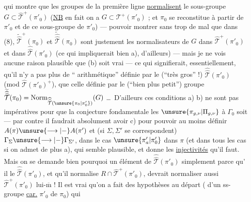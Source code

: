 qui montre que les groupes de la première ligne
\uline{normalisent} le sous-groupe $G\subset\widehat{\mathcal T}^{+}(\pi'_0)$
(\uline{NB} en fait on a $G\subset\mathcal T^{+}(\pi'_0)$ ;  et $\pi_0$
se reconstitue à partir de $\pi'_0$ et de
ce sous-groupe de $\pi'_0$) --- 
pouvoir montrer sans trop de mal
que  dans (8), $\widetilde{\widehat{\mathcal T}}^{+}(\pi_0)$ et $\widetilde{\widehat{\widehat{\mathcal T}}}(\pi_0)$
sont justement les normalisateurs de $G$
dans $\widehat{\mathcal T}^{+}(\pi'_0)$ et dans $\widehat{\widehat{\mathcal T}}(\pi'_0)$ (ce
qui impliquerait bien a), d'ailleurs) ---
mais je ne vois aucune raison plausible
que (b) soit vrai --- ce qui signifierait,
essentiellement, qu'il n'y a pas plus de
`` arithmétique'' définie par le
(``très gros'' !) $\widehat{\widehat{\mathcal T}}(\pi'_0)$ (mod $\widehat{\mathcal T}(\pi'_0)^{+}$), que
celle définie par le (``bien plus petit'') groupe
$\widetilde{\widehat{\widehat{\mathcal T}}}(\pi_0)=\operatorname{Norm}_{\widehat{\widehat{\mathcal T}}(\unsure{\pi_0|\pi'_0})}(G)$ \dots\ D'ailleurs ces
conditions a) b) ne sont pas impératives
pour que la conjecture fondamentale
 les $\unsure{\pi_{g,\nu}|\Pi_{g,\nu}}$ à $\Gamma_0$ soit  ---
par contre il faudrait absolument avoir
c) pour pouvoir au moins définir
$A(\pi)\unsure{\longrightarrow|{-}}A(\pi')$ et (si $\Sigma,\Sigma'$ se correspondent)
$\Gamma_{\Sigma}\unsure{\longrightarrow|{-}}\Gamma_{\Sigma'}$, dans le cas $\unsure{\pi'_a|\pi'_0}$  dans $\pi$
(et dans tous les cas si on admet de plus
a), qui semble  plausible, et donne
les \uline{injectivités} qu'il faut. Mais on
se demande bien pourquoi un élément
de  $\widehat{\widehat{\mathcal T}}(\pi'_0)$ simplement parce qu'
il  le 
 $\widehat{\widehat{\mathcal T}}(\pi'_0)$,  et qu'il normalise
$R\cap\widehat{\mathcal T}^{+}(\pi'_0)$, devrait normaliser aussi
$\widehat{\mathcal T}^{+}(\pi'_0)$ lui-$\overline{\mathrm m}$ ! Il est vrai qu'on a
fait des hypothèses  au départ
( d'un ss-groupe \uline{car.} $\pi'_0$ de $\pi_0$) qui
